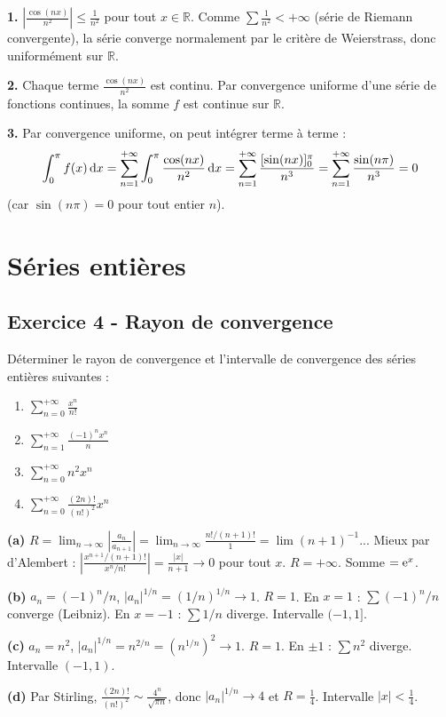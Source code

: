 \documentclass[12pt,a4paper]{article}
\begin{document}
\begin{boitecorrige}
\textbf{1.} $\left|\frac{\cos(nx)}{n^2}\right|\leq\frac{1}{n^2}$ pour tout $x\in\mathbb{R}$. Comme $\sum\frac{1}{n^2}<+\infty$ (série de Riemann convergente), la série converge normalement par le critère de Weierstrass, donc uniformément sur $\mathbb{R}$.

\textbf{2.} Chaque terme $\frac{\cos(nx)}{n^2}$ est continu. Par convergence uniforme d'une série de fonctions continues, la somme $f$ est continue sur $\mathbb{R}$.

\textbf{3.} Par convergence uniforme, on peut intégrer terme à terme :
\[
\int_0^\pi f(x)\,\mathrm{d} x = \sum_{n=1}^{+\infty}\int_0^\pi\frac{\cos(nx)}{n^2}\,\mathrm{d} x = \sum_{n=1}^{+\infty}\frac{[\sin(nx)]_0^\pi}{n^3} = \sum_{n=1}^{+\infty}\frac{\sin(n\pi)}{n^3} = 0
\]
(car $\sin(n\pi)=0$ pour tout entier $n$).
\end{boitecorrige}

\section{Séries entières}

\subsection*{Exercice 4 - Rayon de convergence \niveau{\moyen}}

\begin{boiteexercice}
Déterminer le rayon de convergence et l'intervalle de convergence des séries entières suivantes :
\begin{enumerate}[label=(\alph*)]
  \item $\displaystyle\sum_{n=0}^{+\infty}\frac{x^n}{n!}$
  \item $\displaystyle\sum_{n=1}^{+\infty}\frac{(-1)^n x^n}{n}$
  \item $\displaystyle\sum_{n=0}^{+\infty}n^2 x^n$
  \item $\displaystyle\sum_{n=0}^{+\infty}\frac{(2n)!}{(n!)^2}x^n$
\end{enumerate}
\end{boiteexercice}

\begin{boitecorrige}
\textbf{(a)} $R = \lim_{n\to\infty}\left|\frac{a_n}{a_{n+1}}\right| = \lim_{n\to\infty}\frac{n!/(n+1)!}{1} = \lim(n+1)^{-1}$... Mieux par d'Alembert : $\left|\frac{x^{n+1}/(n+1)!}{x^n/n!}\right|=\frac{|x|}{n+1}\to0$ pour tout $x$. $R=+\infty$. Somme $=\mathrm{e}^x$.

\textbf{(b)} $a_n=(-1)^n/n$, $|a_n|^{1/n}=(1/n)^{1/n}\to1$. $R=1$. En $x=1$ : $\sum(-1)^n/n$ converge (Leibniz). En $x=-1$ : $\sum 1/n$ diverge. Intervalle $(-1,1]$.

\textbf{(c)} $a_n=n^2$, $|a_n|^{1/n}=n^{2/n}=(n^{1/n})^2\to1$. $R=1$. En $\pm1$ : $\sum n^2$ diverge. Intervalle $(-1,1)$.

\textbf{(d)} Par Stirling, $\frac{(2n)!}{(n!)^2}\sim\frac{4^n}{\sqrt{\pi n}}$, donc $|a_n|^{1/n}\to4$ et $R=\frac{1}{4}$. Intervalle $|x|<\frac{1}{4}$.
\end{boitecorrige}
\end{document}

